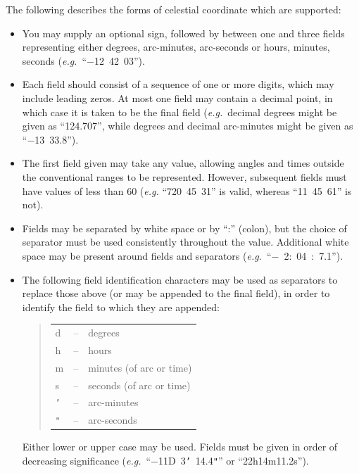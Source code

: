 \documentclass[twoside,11pt]{starlink}
\begin{document}
The following describes the forms of celestial coordinate which are
supported:

\begin{itemize}
\item You may supply an optional sign, followed by between one and
three fields representing either degrees, arc-minutes, arc-seconds or
hours, minutes, seconds (\emph{e.g.}\ ``$-$12~42~03'').

\item Each field should consist of a sequence of one or more digits,
which may include leading zeros. At most one field may contain a
decimal point, in which case it is taken to be the final field
(\emph{e.g.}\ decimal degrees might be given as ``124.707'', while
degrees and decimal arc-minutes might be given as ``$-$13~33.8'').

\item The first field given may take any value, allowing angles and
times outside the conventional ranges to be represented. However,
subsequent fields must have values of less than 60 (\emph{e.g.}
``720~45~31'' is valid, whereas ``11~45~61'' is not).

\item Fields may be separated by white space or by ``:'' (colon), but
the choice of separator must be used consistently throughout the
value. Additional white space may be present around fields and
separators (\emph{e.g.}\ ``$-$~2:~04~:~7.1'').

\item The following field identification characters may be used as
separators to replace those above (or may be appended to the final
field), in order to identify the field to which they are appended:

\begin{quote}
\begin{tabular}{lll}
d & -- & degrees \\
h & -- & hours \\
m & -- & minutes (of arc or time) \\
s & -- & seconds (of arc or time) \\
\texttt{'} & -- & arc-minutes \\
\texttt{"} & -- & arc-seconds
\end{tabular}
\end{quote}

Either lower or upper case may be used.  Fields must be given in order
of decreasing significance
(\emph{e.g.}\ ``$-$11D~3\texttt{'}~14.4\texttt{"}'' or ``22h14m11.2s'').


\end{itemize}
\end{document}
